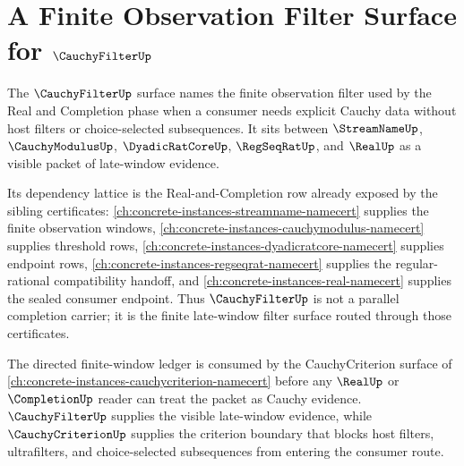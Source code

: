\chapter{A Finite Observation Filter Surface for $\CauchyFilterUp$}
\label{ch:concrete-instances-cauchyfilter-finite-observation-filter}

The $\CauchyFilterUp$ surface names the finite observation filter used by the
Real and Completion phase when a consumer needs explicit Cauchy data without
host filters or choice-selected subsequences. It sits between
$\StreamNameUp$, $\CauchyModulusUp$, $\DyadicRatCoreUp$, $\RegSeqRatUp$, and
$\RealUp$ as a visible packet of late-window evidence.

Its dependency lattice is the Real-and-Completion row already exposed by the
sibling certificates: \autoref{ch:concrete-instances-streamname-namecert}
supplies the finite observation windows,
\autoref{ch:concrete-instances-cauchymodulus-namecert} supplies threshold
rows, \autoref{ch:concrete-instances-dyadicratcore-namecert} supplies endpoint
rows, \autoref{ch:concrete-instances-regseqrat-namecert} supplies the
regular-rational compatibility handoff, and
\autoref{ch:concrete-instances-real-namecert} supplies the sealed consumer
endpoint. Thus $\CauchyFilterUp$ is not a parallel completion carrier; it is
the finite late-window filter surface routed through those certificates.

The directed finite-window ledger is consumed by the CauchyCriterion surface
of \autoref{ch:concrete-instances-cauchycriterion-namecert} before any
$\RealUp$ or $\CompletionUp$ reader can treat the packet as Cauchy evidence.
$\CauchyFilterUp$ supplies the visible late-window evidence, while
$\CauchyCriterionUp$ supplies the criterion boundary that blocks host filters,
ultrafilters, and choice-selected subsequences from entering the consumer
route.

